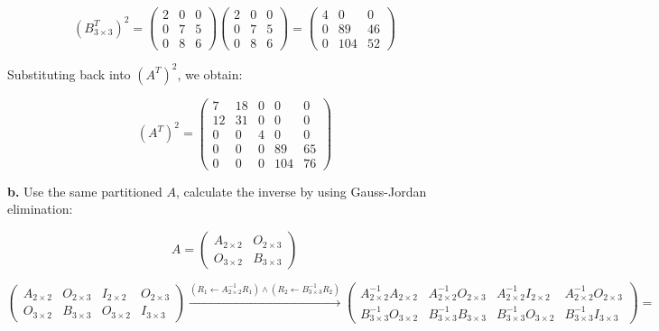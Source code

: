 \documentclass{article}
\begin{document}
\begin{equation*}
  (B_{3\times3}^{T})^{2} =
  \begin{pmatrix}
    2 & 0 & 0 \\
    0 & 7 & 5 \\
    0 & 8 & 6
  \end{pmatrix} \begin{pmatrix}
    2 & 0 & 0 \\
    0 & 7 & 5 \\
    0 & 8 & 6
  \end{pmatrix} =
  \begin{pmatrix}
    4 & 0 & 0 \\
    0 & 89 & 46 \\
    0 & 104 & 52 
  \end{pmatrix}
\end{equation*}

Substituting back into $(A^{T})^{2}$, we obtain:

\begin{equation*}
  (A^{T})^{2} =
  \begin{pmatrix}
    7 & 18 & 0 & 0 & 0 \\
    12 & 31 & 0 & 0 & 0 \\
    0 & 0 & 4 & 0 & 0 \\
    0 & 0 & 0 & 89 & 65 \\
    0 & 0 & 0 & 104 & 76
  \end{pmatrix}
\end{equation*}

\textbf{b.} Use the same partitioned $A$, calculate the inverse by using Gauss-Jordan elimination:

\begin{equation*}
  A = \left(
  \begin{array}{c|c}
    A_{2\times2} & O_{2 \times 3} \\ \hline
    O_{3\times2} & B_{3\times3}
  \end{array}
\right)
\end{equation*}

\begin{equation*}
  \left(
    \begin{array}{c|c|c|c}
      A_{2\times2} & O_{2\times3} & I_{2\times2} & O_{2\times3} \\ \hline
      O_{3\times2} & B_{3\times3} & O_{3\times2} & I_{3\times3}
    \end{array}
  \right)
  \xrightarrow{(R_{1} \leftarrow A_{2\times2}^{-1} R_{1}) \land (R_{2} \leftarrow B_{3\times3}^{-1}R_{2})}
    \left(
    \begin{array}{c|c|c|c}
      A_{2\times2}^{-1}A_{2\times2} & A_{2\times2}^{-1}O_{2\times3} & A_{2\times2}^{-1}I_{2\times2} & A_{2\times2}^{-1}O_{2\times3} \\ \hline
      B_{3\times3}^{-1}O_{3\times2} & B_{3\times3}^{-1}B_{3\times3} & B_{3\times3}^{-1}O_{3\times2} & B_{3\times3}^{-1}I_{3\times3}
    \end{array}
  \right) = 
\end{equation*}
\end{document}
